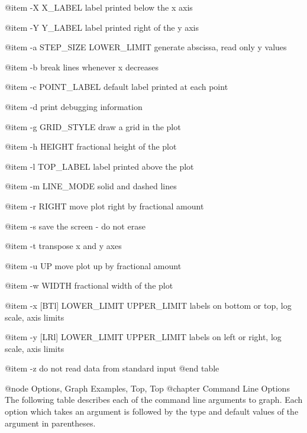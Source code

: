 @item -X X_LABEL
label printed below the x axis

@item -Y Y_LABEL
label printed right of the y axis

@item -a STEP_SIZE LOWER_LIMIT
generate abscissa, read only y values

@item -b
break lines whenever x decreases

@item -c POINT_LABEL
default label printed at each point

@item -d
print debugging information

@item -g GRID_STYLE
draw a grid in the plot

@item -h HEIGHT
fractional height of the plot

@item -l TOP_LABEL
label printed above the plot

@item -m LINE_MODE
solid and dashed lines

@item -r RIGHT
move plot right by fractional amount

@item -s
save the screen - do not erase

@item -t
transpose x and y axes

@item -u UP
move plot up by fractional amount

@item -w WIDTH
fractional width of the plot

@item -x [BTl] LOWER_LIMIT UPPER_LIMIT
labels on bottom or top, log scale, axis limits

@item -y [LRl] LOWER_LIMIT UPPER_LIMIT
labels on left or right, log scale, axis limits 

@item -z
do not read data from standard input
@end table

@node Options, Graph Examples, Top, Top
@chapter Command Line Options
The following table describes each of the command line arguments to graph.
Each option which takes an argument is followed by the type and default
values of the argument in parentheses.

